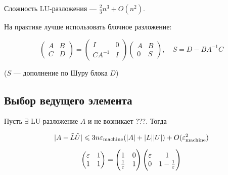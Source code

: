 Сложность LU-разложения --- $\frac{2}{3} n^3 + O(n^2)$.

На практике лучше использовать блочное разложение:

\[
    \begin{pmatrix} A & B \\ C & D \end{pmatrix}
    = \begin{pmatrix} I & 0 \\ C A^{-1} & I \end{pmatrix}
    \begin{pmatrix} A & B \\ 0 & S \end{pmatrix},
    \quad S = D - B A^{-1} C
\]

($S$ --- дополнение по Шуру блока $D$)

\subsection{Выбор ведущего элемента}

\begin{theorem}
    Пусть $\exists$ LU-разложение $A$ и не возникает ???. Тогда

    \[
        |A - \tilde{L} \tilde{U}| \leqslant 3 n \varepsilon_{\text{machine}} (|A| + |L| |U|)
        + O(\varepsilon_{\text{machine}}^2)
    \]
\end{theorem}

\begin{example}
    \[
        \begin{pmatrix} \varepsilon & 1 \\ 1 & 1 \end{pmatrix}
        = \begin{pmatrix} 1 & 0 \\ \frac{1}{\varepsilon} & 1 \end{pmatrix}
        \begin{pmatrix} \varepsilon & 1 \\ 0 & 1 - \frac{1}{\varepsilon} \end{pmatrix}
    \]
\end{example}

